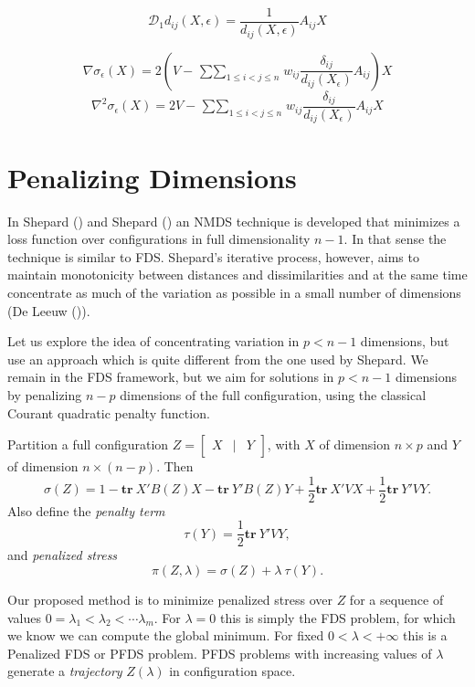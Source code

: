 \documentclass[
  12pt,
  letterpaper,
  DIV=11,
  numbers=noendperiod]{scrreprt}
\theoremstyle{remark}
\begin{document}
\[
\mathcal{D}_1d_{ij}(X,\epsilon)=\frac{1}{d_{ij}(X,\epsilon)}A_{ij}X
\]

\[
\nabla\sigma_\epsilon(X)=2\left(V-\mathop{\sum\sum}_{1\leq i<j\leq n}w_{ij}\frac{\delta_{ij}}{d_{ij}(X_\epsilon)}A_{ij}\right)X
\] \[
\nabla^2\sigma_\epsilon(X)=2V-\mathop{\sum\sum}_{1\leq i<j\leq n}w_{ij}\frac{\delta_{ij}}{d_{ij}(X_\epsilon)}A_{ij}X
\]

\section{Penalizing Dimensions}\label{penalizing-dimensions}

In Shepard () and Shepard
() an NMDS technique is developed that
minimizes a loss function over configurations in full dimensionality
\(n-1\). In that sense the technique is similar to FDS. Shepard's
iterative process, however, aims to maintain monotonicity between
distances and dissimilarities and at the same time concentrate as much
of the variation as possible in a small number of dimensions (De Leeuw
()).

Let us explore the idea of concentrating variation in \(p<n-1\)
dimensions, but use an approach which is quite different from the one
used by Shepard. We remain in the FDS framework, but we aim for
solutions in \(p<n-1\) dimensions by penalizing \(n-p\) dimensions of
the full configuration, using the classical Courant quadratic penalty
function.

Partition a full configuration
\(Z=\begin{bmatrix}X&\mid&Y\end{bmatrix}\), with \(X\) of dimension
\(n\times p\) and \(Y\) of dimension \(n\times(n-p)\). Then
\begin{equation}\label{E:part}   
\sigma(Z)=1-\mathbf{tr}\ X'B(Z)X - \mathbf{tr}\ Y'B(Z)Y+\frac12 \mathbf{tr}\ X'VX+\frac12 \mathbf{tr}\ Y'VY.
\end{equation} Also define the \emph{penalty term}
\begin{equation}\label{E:tau}
\tau(Y)=\frac12\mathbf{tr}\ Y'VY,
\end{equation} and \emph{penalized stress} \begin{equation}\label{E:pi}
\pi(Z,\lambda)=\sigma(Z)+\lambda\ \tau(Y).
\end{equation}

Our proposed method is to minimize penalized stress over \(Z\) for a
sequence of values \(0=\lambda_1<\lambda_2<\cdots\lambda_m\). For
\(\lambda=0\) this is simply the FDS problem, for which we know we can
compute the global minimum. For fixed \(0<\lambda<+\infty\) this is a
Penalized FDS or PFDS problem. PFDS problems with increasing values of
\(\lambda\) generate a \emph{trajectory} \(Z(\lambda)\) in configuration
space.
\end{document}
